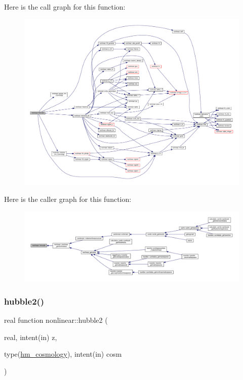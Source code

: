 Here is the call graph for this function\+:
\nopagebreak
\begin{figure}[H]
\begin{center}
\leavevmode
\includegraphics[width=350pt]{namespacenonlinear_acf9ab8f72085502eea51c43dcf5ad67e_cgraph}
\end{center}
\end{figure}
Here is the caller graph for this function\+:
\nopagebreak
\begin{figure}[H]
\begin{center}
\leavevmode
\includegraphics[width=350pt]{namespacenonlinear_acf9ab8f72085502eea51c43dcf5ad67e_icgraph}
\end{center}
\end{figure}
\mbox{\label{namespacenonlinear_a82f340c9a9b18e3f45b2ddbe518cebba}} 
\subsubsection{\texorpdfstring{hubble2()}{hubble2()}}
{\footnotesize\ttfamily real function nonlinear\+::hubble2 (\begin{DoxyParamCaption}\item[{real, intent(in)}]{z,  }\item[{type(\mbox{\hyperlink{structnonlinear_1_1hm__cosmology}{hm\+\_\+cosmology}}), intent(in)}]{cosm }\end{DoxyParamCaption})\hspace{0.3cm}{\ttfamily [private]}}



